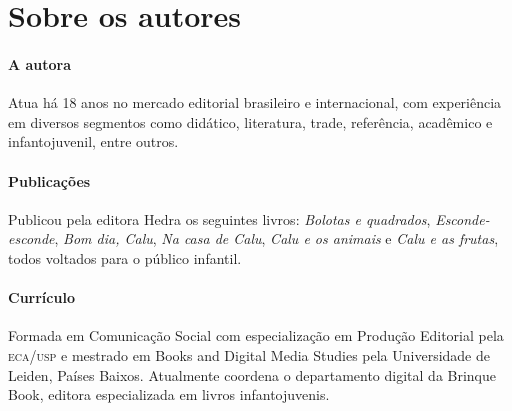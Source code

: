 \documentclass[11pt]{extarticle}
\begin{document}


\section{Sobre os autores}

\paragraph{A autora}
Atua há 18 anos no 
mercado editorial brasileiro e internacional, com experiência 
em diversos segmentos como didático, literatura, trade, 
referência, acadêmico e infantojuvenil, entre outros. 


\paragraph{Publicações}
Publicou pela editora Hedra os seguintes livros: \emph{Bolotas e quadrados},
\emph{Esconde-esconde}, \emph{Bom dia, Calu}, \emph{Na casa de Calu}, \emph{Calu e os animais} e
\emph{Calu e as frutas}, todos voltados para o público infantil.

\paragraph{Currículo} 
Formada em Comunicação Social com 
especialização em Produção Editorial pela \textsc{eca/usp} 
e mestrado em Books and Digital Media Studies pela 
Universidade de Leiden, Países Baixos.
Atualmente coordena o departamento digital da Brinque 
Book, editora especializada em livros infantojuvenis.
\end{document}
